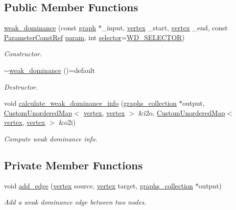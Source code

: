 \subsection*{Public Member Functions}
\begin{DoxyCompactItemize}
\item 
\hyperlink{classweak__dominance_a346b930ca27ad3d7508fc577a10a8aac}{weak\+\_\+dominance} (const \hyperlink{structgraph}{graph} $\ast$\+\_\+input, \hyperlink{graph_8hpp_abefdcf0544e601805af44eca032cca14}{vertex} \+\_\+start, \hyperlink{graph_8hpp_abefdcf0544e601805af44eca032cca14}{vertex} \+\_\+end, const \hyperlink{Parameter_8hpp_a37841774a6fcb479b597fdf8955eb4ea}{Parameter\+Const\+Ref} \hyperlink{classweak__dominance_a5d3a2749ddef3b503fa43d8fb3a1c2fe}{param}, int \hyperlink{classweak__dominance_a9d12594778b1fb4868e1a26bfdba53b8}{selector}=\hyperlink{weak__dominance_8hpp_ab470aec834abd87d7156e27bcb2b0a76}{W\+D\+\_\+\+S\+E\+L\+E\+C\+T\+OR})
\begin{DoxyCompactList}\small\item\em Constructor. \end{DoxyCompactList}\item 
\hyperlink{classweak__dominance_a7d24d930610c420aef3eaf1f69a5ee5c}{$\sim$weak\+\_\+dominance} ()=default
\begin{DoxyCompactList}\small\item\em Destructor. \end{DoxyCompactList}\item 
void \hyperlink{classweak__dominance_af0c241b18a9f5ffff0381adaede998b3}{calculate\+\_\+weak\+\_\+dominance\+\_\+info} (\hyperlink{structgraphs__collection}{graphs\+\_\+collection} $\ast$output, \hyperlink{custom__map_8hpp_ad1ed68f2ff093683ab1a33522b144adc}{Custom\+Unordered\+Map}$<$ \hyperlink{graph_8hpp_abefdcf0544e601805af44eca032cca14}{vertex}, \hyperlink{graph_8hpp_abefdcf0544e601805af44eca032cca14}{vertex} $>$ \&i2o, \hyperlink{custom__map_8hpp_ad1ed68f2ff093683ab1a33522b144adc}{Custom\+Unordered\+Map}$<$ \hyperlink{graph_8hpp_abefdcf0544e601805af44eca032cca14}{vertex}, \hyperlink{graph_8hpp_abefdcf0544e601805af44eca032cca14}{vertex} $>$ \&o2i)
\begin{DoxyCompactList}\small\item\em Compute weak dominance info. \end{DoxyCompactList}\end{DoxyCompactItemize}
\subsection*{Private Member Functions}
\begin{DoxyCompactItemize}
\item 
void \hyperlink{classweak__dominance_a64ede646c8dfba6460ac1042bb7e5aa0}{add\+\_\+edge} (\hyperlink{graph_8hpp_abefdcf0544e601805af44eca032cca14}{vertex} source, \hyperlink{graph_8hpp_abefdcf0544e601805af44eca032cca14}{vertex} target, \hyperlink{structgraphs__collection}{graphs\+\_\+collection} $\ast$output)
\begin{DoxyCompactList}\small\item\em Add a weak dominance edge between two nodes. \end{DoxyCompactList}\end{DoxyCompactItemize}
